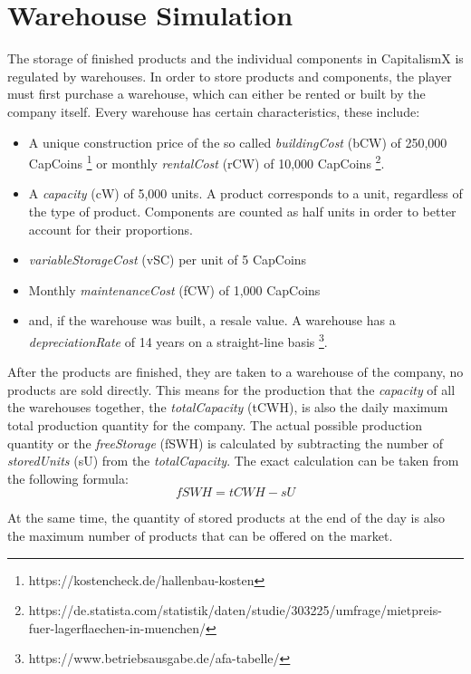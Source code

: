 \section{Warehouse Simulation} \label{warehouse_simulation}

The storage of finished products and the individual components in CapitalismX is regulated by warehouses. In order to store products and components, the player must first purchase a warehouse, which can either be rented or built by the company itself. Every warehouse has certain characteristics, these include:
\begin{itemize}
    \item A unique construction price of the so called \textit{buildingCost} (\gls{bCW}) of 250,000 CapCoins  \footnote{https://kostencheck.de/hallenbau-kosten} or monthly \textit{rentalCost} (\gls{rCW}) of 10,000 CapCoins \footnote{https://de.statista.com/statistik/daten/studie/303225/umfrage/mietpreis-fuer-lagerflaechen-in-muenchen/}.
    \item A \textit{capacity} (\gls{cW}) of 5,000 units. A product corresponds to a unit, regardless of the type of product. Components are counted as half units in order to better account for their proportions. 
    \item \textit{variableStorageCost} (\gls{vSC}) per unit of 5 CapCoins
    \item Monthly \textit{maintenanceCost} (\gls{fCW}) of 1,000 CapCoins
    \item and, if the warehouse was built, a resale value. A warehouse has a \textit{depreciationRate} of 14 years on a straight-line basis \footnote{https://www.betriebsausgabe.de/afa-tabelle/}.
\end{itemize}

After the products are finished, they are taken to a warehouse of the company, no products are sold directly. This means for the production that the \textit{capacity} of all the warehouses together, the \textit{totalCapacity} (\gls{tCWH}), is also the daily maximum total production quantity for the company. The actual possible production quantity or the \textit{freeStorage} (\gls{fSWH}) is calculated by subtracting the number of \textit{storedUnits} (\gls{sU}) from the \textit{totalCapacity}. The exact calculation can be taken from the following formula: 
\begin{equation}
    fSWH = tCWH - sU
\end{equation}

At the same time, the quantity of stored products at the end of the day is also the maximum number of products that can be offered on the market. 

